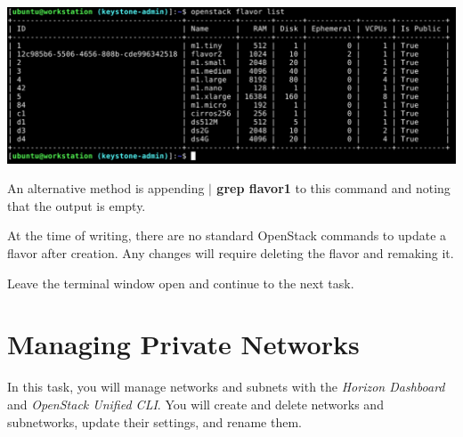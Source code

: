 \documentclass[letterpaper, 12pt]{article}
\begin{document}
\begin{enumerate}
\begin{labstep}
        \begin{center}
            \includegraphics[width=\linewidth]{images/part2/step12.png}
        \end{center}
    \end{labstep}

    \begin{tipbox}
        An alternative method is appending \textbf{$\vert$ grep flavor1} to this command and noting that the output is empty.
    \end{tipbox}

    \begin{notebox}
        At the time of writing, there are no standard OpenStack commands to update a flavor after creation.
        Any changes will require deleting the flavor and remaking it.
    \end{notebox}

    \begin{labstep}
        Leave the terminal window open and continue to the next task.
    \end{labstep}

\end{enumerate}

\section{Managing Private Networks}\label{sec:managing-private_networks}
In this task, you will manage networks and subnets with the \textit{Horizon Dashboard} and \textit{OpenStack Unified CLI}.
You will create and delete networks and subnetworks, update their settings, and rename them.
\end{document}
